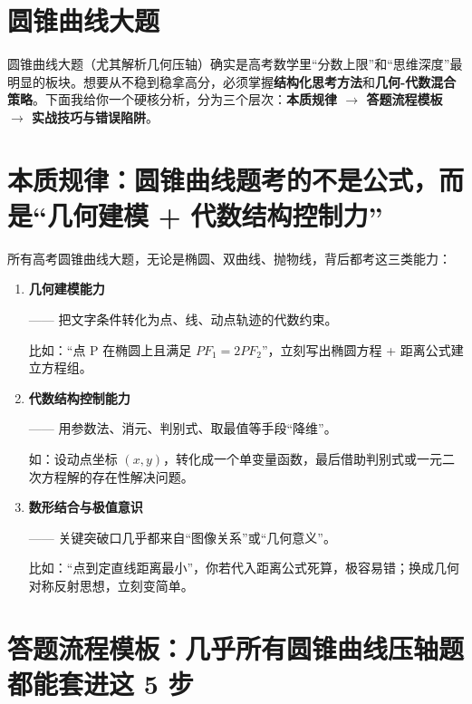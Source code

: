 \documentclass{ctexart}
\begin{document}
\section{圆锥曲线大题}
	
	圆锥曲线大题（尤其解析几何压轴）确实是高考数学里``分数上限''和``思维深度''最明显的板块。想要从不稳到稳拿高分，必须掌握\textbf{结构化思考方法}和\textbf{几何-代数混合策略}。下面我给你一个硬核分析，分为三个层次：\textbf{本质规律 $\rightarrow$ 答题流程模板 $\rightarrow$ 实战技巧与错误陷阱}。
	
	
	\section{本质规律：圆锥曲线题考的不是公式，而是``几何建模 + 代数结构控制力''}
	
	所有高考圆锥曲线大题，无论是椭圆、双曲线、抛物线，背后都考这三类能力：
	
		\begin{enumerate}[label=\arabic*.]
			\item \textbf{几何建模能力}
			\par —— 把文字条件转化为点、线、动点轨迹的代数约束。
			\par 比如：``点 P 在椭圆上且满足 $PF_1 = 2PF_2$''，立刻写出椭圆方程 + 距离公式建立方程组。
			
			\item \textbf{代数结构控制能力}
			\par —— 用参数法、消元、判别式、取最值等手段``降维''。
			\par 如：设动点坐标 $(x, y)$，转化成一个单变量函数，最后借助判别式或一元二次方程解的存在性解决问题。
			
			\item \textbf{数形结合与极值意识}
			\par —— 关键突破口几乎都来自``图像关系''或``几何意义''。
			\par 比如：``点到定直线距离最小''，你若代入距离公式死算，极容易错；换成几何对称反射思想，立刻变简单。
		\end{enumerate}

	
	\section{答题流程模板：几乎所有圆锥曲线压轴题都能套进这 5 步}
	
\end{document}

